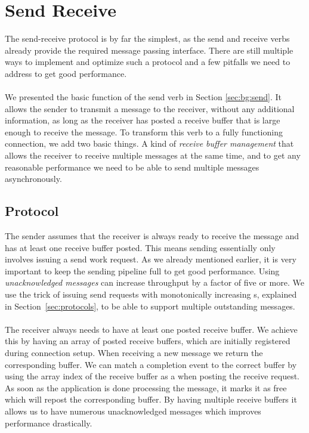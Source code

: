 \section{Send Receive} \label{sec:conn:send}\label{sendrcv}\label{sendrcv-design}

The send-receive protocol is by far the simplest, as the send and receive verbs already provide the required 
message passing interface. There are still multiple ways to implement and optimize such a protocol and a few pitfalls 
we need to address to get good performance.

\paragraph{} We presented the basic function of the send verb in Section \ref{sec:bg:send}. It allows the sender to transmit 
a message to the receiver, without any additional information, as long as the receiver has posted a receive buffer that is 
large enough to receive the message. To transform this verb to a fully functioning connection, we add two basic things. 
A kind of \emph{receive buffer management} that allows the receiver to receive multiple messages at the same time, 
and to get any reasonable performance we need to be able to send multiple messages asynchronously.

\subsection{Protocol} 

The sender assumes that the receiver is always ready to receive the message and has at least one receive buffer 
posted. This means sending essentially only involves issuing a send work request. As we already mentioned earlier, it is very 
important to keep the sending pipeline full to get good performance. Using \emph{unacknowledged messages} can increase
throughput by a factor of five or more.
We use the trick of issuing send requests with monotonically increasing s, explained in Section~\ref{sec:protocols},
to be able to support multiple 
outstanding messages.

\paragraph{} The receiver always needs to have at least one posted receive buffer. We achieve this by having an array of 
posted receive buffers, which are initially registered during connection setup. When receiving a new message we return 
the corresponding buffer. We can match a completion event to the correct buffer by using the array index of the receive 
buffer as a  when posting the receive request. As soon as the application is done processing the message,
it marks it as free which will repost the corresponding buffer. By having multiple receive buffers it allows us to have 
numerous unacknowledged messages which improves performance drastically.

